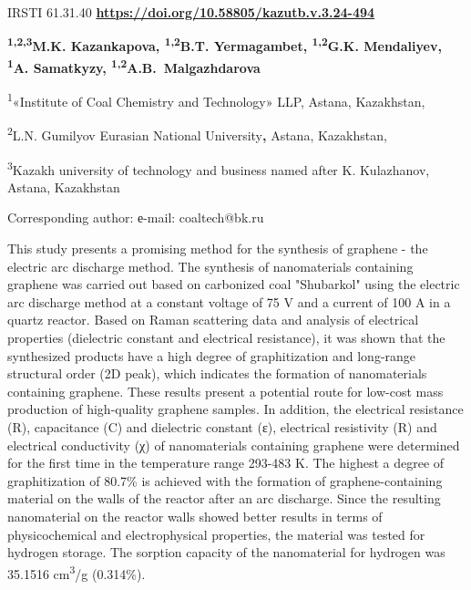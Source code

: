 \newpage
IRSTI 61.31.40
\hfill {\bfseries \href{https://doi.org/10.58805/kazutb.v.3.24-494}{https://doi.org/10.58805/kazutb.v.3.24-494}}


\begin{center}
{\bfseries \textsuperscript{1,2,3}M.K. Kazankapova, \textsuperscript{1,2}B.T. Yermagambet\envelope, \textsuperscript{1,2}G.K. Mendaliyev, \textsuperscript{1}A. Samatkyzy, \textsuperscript{1,2}A.B.~Malgazhdarova}

\textsuperscript{1}«Institute of Coal Chemistry and Technology» LLP,
Astana, Kazakhstan,

\textsuperscript{2}L.N. Gumilyov Eurasian National University{\bfseries ,}
Astana, Kazakhstan,

\textsuperscript{3}Kazakh university of technology and business named
after K. Kulazhanov, Astana, Kazakhstan
\end{center}
\envelope Corresponding author: е-mail: coaltech@bk.ru


This study presents a promising method for the synthesis of graphene -
the electric arc discharge method. The synthesis of nanomaterials
containing graphene was carried out based on carbonized coal "Shubarkol"
using the electric arc discharge method at a constant voltage of 75 V
and a current of 100 A in a quartz reactor. Based on Raman scattering
data and analysis of electrical properties (dielectric constant and
electrical resistance), it was shown that the synthesized products have
a high degree of graphitization and long-range structural order (2D
peak), which indicates the formation of nanomaterials containing
graphene. These results present a potential route for low-cost mass
production of high-quality graphene samples. In addition, the electrical
resistance (R), capacitance (C) and dielectric constant (ε), electrical
resistivity (R) and electrical conductivity (χ) of nanomaterials
containing graphene were determined for the first time in the
temperature range 293-483 K. The highest a degree of graphitization of
80.7\% is achieved with the formation of graphene-containing material on
the walls of the reactor after an arc discharge. Since the resulting
nanomaterial on the reactor walls showed better results in terms of
physicochemical and electrophysical properties, the material was tested
for hydrogen storage. The sorption capacity of the nanomaterial for
hydrogen was 35.1516 cm\textsuperscript{3}/g (0.314\%).

